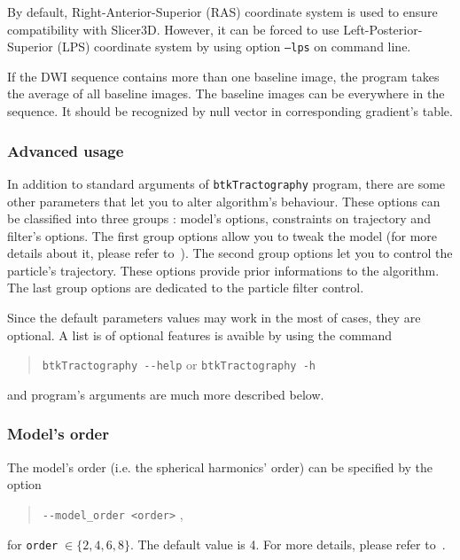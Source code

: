         By default, Right-Anterior-Superior (RAS) coordinate system is used to 
        ensure compatibility with Slicer3D. However, it can be forced to use
Left-Posterior-Superior (LPS) coordinate system by using option \texttt{--lps}
on command line.

        If the DWI sequence contains more than one baseline image, the program 
        takes the average of all baseline images. The baseline images can be
everywhere in the sequence. It should be recognized by null vector in
corresponding gradient's table.

    \subsubsection*{Advanced usage}
        In addition to standard arguments of \texttt{btkTractography} program, 
        there are some other parameters that let you to alter algorithm's
behaviour. These options can be classified into three groups : model's options,
constraints on trajectory and filter's options. The first group options allow
you to tweak the model (for more details about it, please refer
to~\cite{descoteaux_regularized_2007}). The second group options let you to
control the particle's trajectory. These options provide prior informations to
the algorithm. The last group options are dedicated to the particle filter
control.

        Since the default parameters values may work in the most of cases, they 
        are optional. A list is of optional features is avaible by using the
command
            \begin{quote}
                \texttt{btkTractography -\hspace{0.1mm}-help} \hspace{0.5mm} or 
                \hspace{0.5mm} \texttt{btkTractography -h}
            \end{quote}
        and program's arguments are much more described below.


    \subsubsection*{Model's order}
        The model's order (i.e. the spherical harmonics' order) can be specified
        by the option
            \begin{quote}
                \texttt{-\hspace{0.1mm}-model\_order <order>} \enspace ,
            \end{quote}
        for \texttt{order}$\;\in\{2,4,6,8\}$. The default value is 4. For more 
        details, please refer to~\cite{descoteaux_regularized_2007}.

